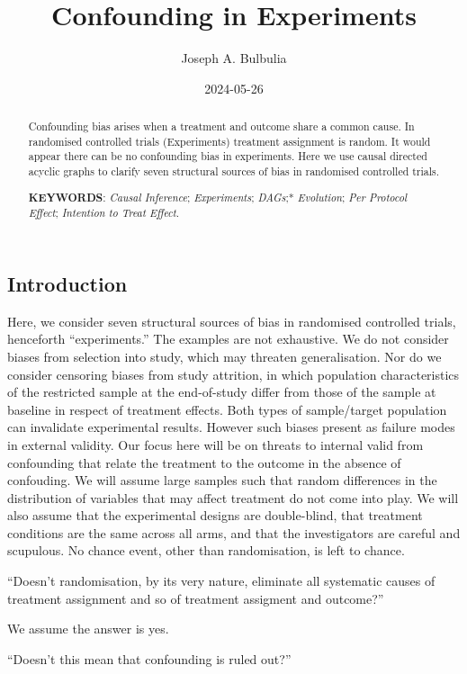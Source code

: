 \documentclass[
  single column]{article}
\title{Confounding in Experiments}
\author{Joseph A. Bulbulia}
\affil{%
             \small{     Victoria University of Wellington, New Zealand
          ORCID \textcolor[HTML]{A6CE39}{\aiOrcid} ~0000-0002-5861-2056 }
              }
\date{2024-05-26}
\begin{document}
\maketitle
\begin{abstract}
Confounding bias arises when a treatment and outcome share a common
cause. In randomised controlled trials (Experiments) treatment
assignment is random. It would appear there can be no confounding bias
in experiments. Here we use causal directed acyclic graphs to clarify
seven structural sources of bias in randomised controlled trials.

\textbf{KEYWORDS}: \emph{Causal Inference}; \emph{Experiments};
\emph{DAGs};* \emph{Evolution}; \emph{Per Protocol Effect};
\emph{Intention to Treat Effect}.
\end{abstract}

\subsection{Introduction}\label{introduction}

Here, we consider seven structural sources of bias in randomised
controlled trials, henceforth ``experiments.'' The examples are not
exhaustive. We do not consider biases from selection into study, which
may threaten generalisation. Nor do we consider censoring biases from
study attrition, in which population characteristics of the restricted
sample at the end-of-study differ from those of the sample at baseline
in respect of treatment effects. Both types of sample/target population
can invalidate experimental results. However such biases present as
failure modes in external validity. Our focus here will be on threats to
internal valid from confounding that relate the treatment to the outcome
in the absence of confouding. We will assume large samples such that
random differences in the distribution of variables that may affect
treatment do not come into play. We will also assume that the
experimental designs are double-blind, that treatment conditions are the
same across all arms, and that the investigators are careful and
scupulous. No chance event, other than randomisation, is left to chance.

``Doesn't randomisation, by its very nature, eliminate all systematic
causes of treatment assignment and so of treatment assigment and
outcome?''

We assume the answer is yes.

``Doesn't this mean that confounding is ruled out?''
\end{document}
